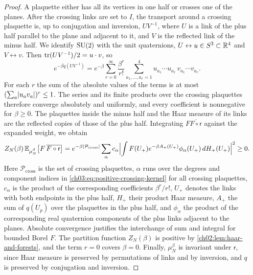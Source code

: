 \begin{proof}
A plaquette either has all its vertices in one half or crosses one of the planes. After the crossing links are set to $I$, the transport around a crossing plaquette is, up to conjugation and inversion, $UV^{-1}$, where $U$ is a link of the plus half parallel to the plane and adjacent to it, and $V$ is the reflected link of the minus half. We identify $\mathrm{SU}(2)$ with the unit quaternions, $U\leftrightarrow u\in S^3\subset\mathbb R^4$ and $V\leftrightarrow v$. Then $\operatorname{tr}(UV^{-1})/2=u\cdot v$, so
\begin{equation}\label{ch03:eq:positive-crossing-kernel}
 e^{-\beta q(UV^{-1})}=e^{-\beta}\sum_{r=0}^\infty\frac{\beta^r}{r!}\sum_{a_1,\dots,a_r=1}^4u_{a_1}\cdots u_{a_r}\,v_{a_1}\cdots v_{a_r}.
\end{equation}
For each $r$ the sum of the absolute values of the terms is at most $(\sum_a\lvert u_av_a\rvert)^r\le1$. The series and its finite products over the crossing plaquettes therefore converge absolutely and uniformly, and every coefficient is nonnegative for $\beta\ge0$. The plaquettes inside the minus half and the Haar measure of its links are the reflected copies of those of the plus half. Integrating $F\overline{F\circ\mathsf r}$ against the expanded weight, we obtain
\begin{equation}\label{ch03:eq:reflection-squares}
 Z_N(\beta)\,\mathbb E_{\mu_N^\beta}\bigl[F\,\overline{F\circ\mathsf r}\bigr]
 =e^{-\beta\lvert \mathcal P_{\mathrm{cross}}\rvert}\sum_\alpha c_\alpha\Bigl\lvert\int F(U_+)e^{-\beta A_+(U_+)}\phi_\alpha(U_+)\,dH_+(U_+)\Bigr\rvert^2\ge0.
\end{equation}
Here $\mathcal P_{\mathrm{cross}}$ is the set of crossing plaquettes, $\alpha$ runs over the degrees and component indices in \eqref{ch03:eq:positive-crossing-kernel} for all crossing plaquettes, $c_\alpha$ is the product of the corresponding coefficients $\beta^r/r!$, $U_+$ denotes the links with both endpoints in the plus half, $H_+$ their product Haar measure, $A_+$ the sum of $q(U_p)$ over the plaquettes in the plus half, and $\phi_\alpha$ the product of the corresponding real quaternion components of the plus links adjacent to the planes. Absolute convergence justifies the interchange of sum and integral for bounded Borel $F$. The partition function $Z_N(\beta)$ is positive by \cref{ch02:lem:haar-and-forests}, and the term $r=0$ covers $\beta=0$. Finally, $\mu_N^\beta$ is invariant under $\mathsf r$, since Haar measure is preserved by permutations of links and by inversion, and $q$ is preserved by conjugation and inversion.
\end{proof}

